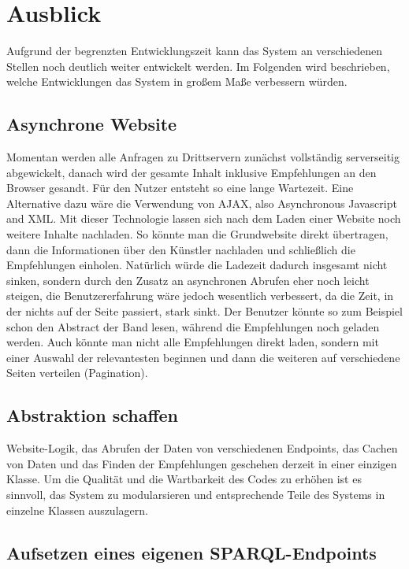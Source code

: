 \section{Ausblick}

Aufgrund der begrenzten Entwicklungszeit kann das System an verschiedenen Stellen noch deutlich weiter entwickelt werden. Im Folgenden wird beschrieben, welche Entwicklungen das System in großem Maße verbessern würden.


\subsection{Asynchrone Website}
Momentan werden alle Anfragen zu Drittservern zunächst vollständig serverseitig abgewickelt, danach wird der gesamte Inhalt inklusive Empfehlungen an den Browser gesandt. Für den Nutzer entsteht so eine lange Wartezeit.
Eine Alternative dazu wäre die Verwendung von AJAX, also Asynchronous Javascript and XML. Mit dieser Technologie lassen sich nach dem Laden einer Website noch weitere Inhalte nachladen. So könnte man die Grundwebsite direkt übertragen, dann die Informationen über den Künstler nachladen und schließlich die Empfehlungen einholen. Natürlich würde die Ladezeit dadurch insgesamt nicht sinken, sondern durch den Zusatz an asynchronen Abrufen eher noch leicht steigen, die Benutzererfahrung wäre jedoch wesentlich verbessert, da die Zeit, in der nichts auf der Seite passiert, stark sinkt. Der Benutzer könnte so zum Beispiel schon den Abstract der Band lesen, während die Empfehlungen noch geladen werden. Auch könnte man nicht alle Empfehlungen direkt laden, sondern mit einer Auswahl der relevantesten beginnen und dann die weiteren auf verschiedene Seiten verteilen (\glqq Pagination\grqq).


\subsection{Abstraktion schaffen}


Website-Logik, das Abrufen der Daten von verschiedenen Endpoints, das Cachen von Daten und das Finden der Empfehlungen geschehen derzeit in einer einzigen Klasse. Um die Qualität und die Wartbarkeit des Codes zu erhöhen ist es sinnvoll, das System zu modularsieren und entsprechende Teile des Systems in einzelne Klassen auszulagern.


\subsection{Aufsetzen eines eigenen SPARQL-Endpoints}


